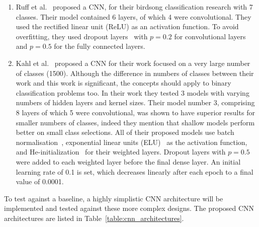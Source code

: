\begin{enumerate}

  \item Ruff et al.~\cite{ruff2020automated} proposed a  CNN, for their birdsong
    classification research with 7 classes. Their model contained
    6 layers, of which 4 were convolutional. They used the rectified linear unit
    (ReLU) as an activation function. To avoid overfitting, they used dropout
    layers~\cite{srivastava2014dropout} with $p=0.2$ for
    convolutional layers and $p=0.5$ for the fully connected layers.

  \item Kahl et al.~\cite{kahl2017large} proposed a CNN for their work focused
    on a very large number of classes (1500). Although the difference in numbers
    of classes between their work and this work is significant, the concepts
    should apply to binary classification problems too. In their work they
    tested 3 models with varying numbers of hidden layers and kernel sizes.
    Their model number 3, comprising 8 layers of which 5 were convolutional,
    was shown to have superior results for smaller numbers of classes, indeed
    they mention that shallow models perform better on small class selections.
    All of their proposed models use batch normalisation~\cite{ioffe2015batch},
    exponential linear units (ELU)~\cite{clevert2015fast} as the activation
    function, and He-initialization~\cite{he2015delving} for their weighted
    layers. Dropout layers with $p=0.5$ were added to each weighted layer before
    the final dense layer. An initial learning rate of 0.1 is set, which
    decreases linearly after each epoch to a final value of 0.0001.


\end{enumerate}

To test against a baseline, a highly simplistic CNN architecture will be
implemented and tested against these more complex designs. The proposed CNN
architectures are listed in Table~\ref{table:cnn_architectures}.

